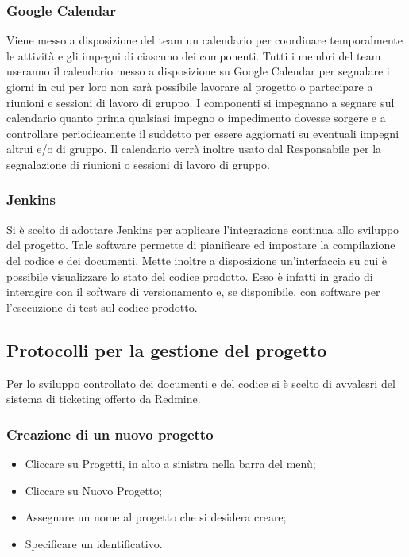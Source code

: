 \subsubsection{Google Calendar}
\label{4.2}
Viene messo a disposizione del team un calendario per coordinare temporalmente le attività e gli impegni di ciascuno dei componenti.
Tutti i membri del team useranno il calendario messo a disposizione su Google Calendar per segnalare i giorni in cui per loro non sarà possibile lavorare al progetto o partecipare a riunioni e sessioni di lavoro di gruppo. I componenti si impegnano a segnare sul calendario quanto prima qualsiasi impegno o impedimento dovesse sorgere e a controllare periodicamente il suddetto per essere aggiornati su eventuali impegni altrui e/o di gruppo.
Il calendario verrà inoltre usato dal Responsabile per la segnalazione di riunioni o sessioni di lavoro di gruppo.

\subsubsection{Jenkins}
\label{}
Si è scelto di adottare Jenkins per applicare l’integrazione continua allo sviluppo del progetto.
Tale software permette di pianificare ed impostare la compilazione del codice e dei documenti. 
Mette inoltre a disposizione un'interfaccia su cui è possibile visualizzare lo stato del codice prodotto. 
Esso è infatti in grado di interagire con il software di versionamento e, se disponibile, con software per l’esecuzione di test sul codice prodotto.


\subsection{Protocolli per la gestione del progetto}

Per lo sviluppo controllato dei documenti e del codice si è scelto di avvalesri del sistema di ticketing offerto da Redmine.
\subsubsection{Creazione di un nuovo progetto}
\begin{itemize}
\item Cliccare su Progetti, in alto a sinistra nella barra del menù;
\item Cliccare su Nuovo Progetto;
\item Assegnare un nome al progetto che si desidera creare;
\item Specificare un identificativo.
\end{itemize}

